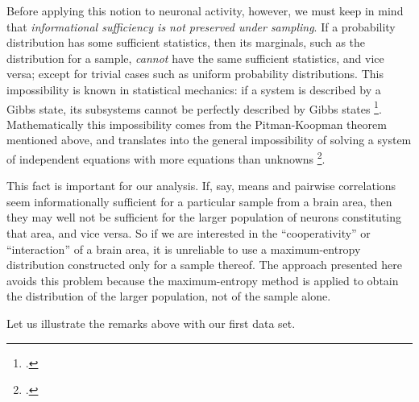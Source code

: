 \documentclass[\ifafour a4paper,12pt,\else a5paper,10pt,\fi%
onecolumn,oneside,article,%
british%
]{memoir}
\theoremstyle{remark}
\theoremstyle{innote}
\newcommand*{\citep}{\footcites}
\renewcommand*{\|}{\nonscript\,\vert\nonscript\;\mathopen{}}
\newcommand*{\sect}{\S}%
\newcommand*{\eg}{{e.g.}}
\begin{document}
Before applying this notion to neuronal activity, however, we must keep in
mind that \emph{informational sufficiency is not preserved under sampling}.
If a probability distribution has some sufficient statistics, then its
marginals, such as the distribution for a sample, \emph{cannot} have the
same sufficient statistics, and vice versa; except for trivial cases such
as uniform probability distributions. %
This impossibility is known in statistical mechanics: if a system is
described by a Gibbs state, its subsystems cannot be perfectly described by
Gibbs states \citep[\eg][and references therein]{maesetal1999}.
Mathematically this impossibility comes from the Pitman-Koopman theorem
mentioned above, and translates into the general impossibility of solving a
system of independent equations with more equations than unknowns
\citep[\sect~3.1]{portamanaetal2015}.

This fact is important for our analysis. If, say, means and pairwise
correlations seem informationally sufficient for a particular sample from a
brain area, then they may well not be sufficient for the larger population
of neurons constituting that area, and vice versa. So if we are interested
in the \enquote{cooperativity} or \enquote{interaction} of a brain area, it
is unreliable to use a maximum-entropy distribution constructed only for a
sample
thereof. %
The approach presented here avoids this problem because the maximum-entropy
method is applied to obtain the distribution of the larger population, not
of the sample alone.

\bigskip

Let us illustrate the remarks above with our first data set.
\end{document}
